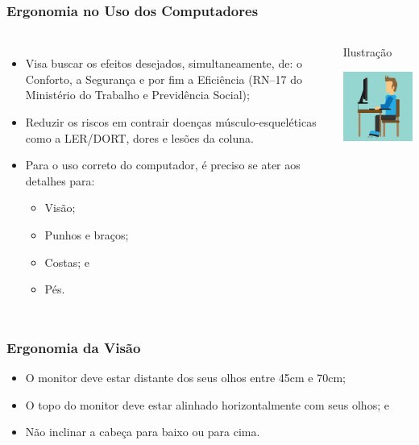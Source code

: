 \documentclass[aspectratio=169]{beamer} %
\begin{document}
\begin{frame}
	\frametitle{Ergonomia no Uso dos Computadores}

\begin{columns}
	\begin{itemize}
		\item Visa buscar os efeitos desejados, simultaneamente, de: o Conforto, a Segurança e por fim a Eficiência (RN--17 do Ministério do Trabalho e Previdência Social);
		\item  Reduzir os riscos em contrair doenças músculo-esqueléticas como a LER/DORT, dores e lesões da coluna.
		\item Para o uso correto do computador, é preciso se ater aos detalhes para:
		\begin{itemize}
			\item Visão;
			\item Punhos e bra\c cos;
			\item Costas; e
			\item Pés.
		\end{itemize}
	\end{itemize}

	\begin{exampleblock}{Ilustra\c cão}
		\begin{center}
			\includegraphics[scale=0.4]{img/ergonomia}
		\end{center}			
	\end{exampleblock}
\end{columns}
\end{frame}

\begin{frame}
	\frametitle{Ergonomia da Visão}
	
	\begin{itemize}
		\item O monitor deve estar distante dos seus olhos entre 45cm e 70cm;
		\item O topo do monitor deve estar alinhado horizontalmente com seus olhos; e
		\item Não inclinar a cabeça para baixo ou para cima.
	\end{itemize}
\end{frame}
\end{document}
